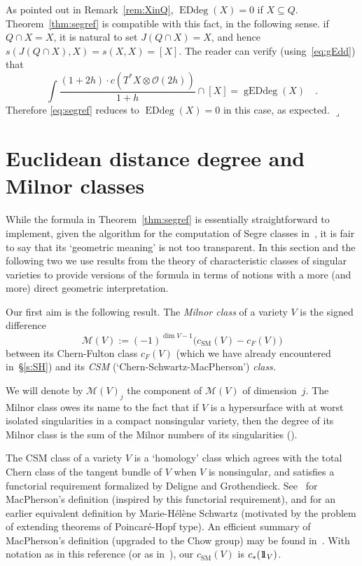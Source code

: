\documentclass[11pt]{amsart}
\numberwithin{equation}{section}
\newcommand{\cM}{{\mathcal M}}
\newcommand{\cO}{{\mathscr O}}
\newcommand{\one}{1\hskip-3.5pt1}
\newcommand{\csm}{{c_{\text{SM}}}}
\DeclareMathOperator{\Edd}{EDdeg}
\DeclareMathOperator{\gEdd}{gEDdeg}
\newcommand{\qede}{\hfill$\lrcorner$}
\begin{document}
\begin{remark}\label{rem:segreXinQ}
As pointed out in Remark~\ref{rem:XinQ}, $\Edd(X)=0$ if $X\subseteq Q$.
Theorem~\ref{thm:segref} is compatible with this fact, in the following sense.
if $Q\cap X=X$, it is natural to set $J(Q\cap X)=X$, and hence
$s(J(Q\cap X),X)=s(X,X)=[X]$. The reader can verify (using~\eqref{eq:gEdd}) that
\[
\int \frac{(1+2h)\cdot c(T^*X\otimes \cO(2h))}{1+h} \cap [X] = \gEdd(X)\quad.
\]
Therefore \eqref{eq:segref} reduces to $\Edd(X)=0$ in this case, as expected.
\qede\end{remark}


\section{Euclidean distance degree and Milnor classes}\label{s:tran}
While the formula in Theorem~\ref{thm:segref} is essentially straightforward
to implement, given the algorithm for the computation of Segre classes
in~\cite{Harris201726}, it is fair to say that its `geometric meaning' is not too
transparent. In this section and the following two we use results from the 
theory of characteristic classes of singular varieties to provide versions of 
the formula in terms of notions with a more (and more) direct geometric 
interpretation.

Our first aim is the following result. The {\em Milnor class\/} of a variety $V$ 
is the signed difference
\[
\cM(V) := (-1)^{\dim V-1} \big(\csm(V)-c_F(V)\big)
\]
between its Chern-Fulton class $c_F(V)$ (which we have already encountered
in~\S\ref{s:SH}) and its {\em CSM} (`Chern-Schwartz-MacPherson') {\em class.\/}

We will denote by $\cM(V)_j$ the component of $\cM(V)$ of dimension~$j$.
The Milnor class owes its name to the fact that if $V$ is a hypersurface with at
worst isolated singularities in a compact nonsingular variety, then the degree of 
its Milnor class is the sum of the Milnor numbers of its singularities
(\cite[Example~0.1]{MR2002g:14005}).

The CSM class of a variety $V$ is a `homology' class which agrees with the total
Chern class of the tangent bundle of $V$ when $V$ is nonsingular, and satisfies
a functorial requirement formalized by Deligne and Grothendieck. See~\cite{MR0361141}
for MacPherson's definition (inspired by this functorial requirement), and
\cite{MR35:3707, MR32:1727} for an earlier equivalent definition by Marie-H\'el\`ene
Schwartz (motivated by the problem of extending theorems of Poincar\'e-Hopf type).
An efficient summary of MacPherson's definition (upgraded to the Chow group) may 
be found in~\cite[Example~19.1.7]{85k:14004}. With notation as in this reference 
(or as in~\cite{MR0361141}), our $\csm(V)$ is $c_*(\one_V)$.
\end{document}
